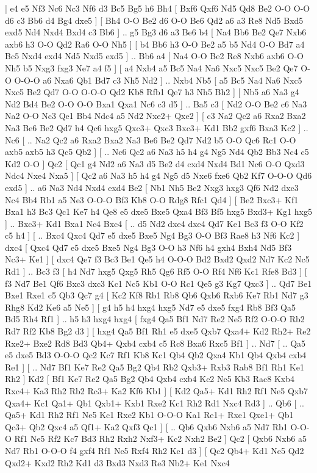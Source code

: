 \makegametitle 
|   e4   e5    Nf3   Nc6    Nc3   Nf6    d3   Bc5    Bg5   h6    Bh4 [  Bxf6 Qxf6  Nd5 Qd8  Be2 O-O  O-O d6  c3 Bb6  d4 Bg4  dxe5   ]  [  Bh4 O-O  Be2 d6  O-O Be6  Qd2 a6  a3 Re8  Nd5 Bxd5  exd5 Nd4  Nxd4 Bxd4  c3 Bb6   ] .. g5    Bg3   d6    a3   Be6    b4 [  Na4 Bb6  Be2 Qe7  Nxb6 axb6  h3 O-O  Qd2 Ra6  O-O Nh5   ]  [  b4 Bb6  h3 O-O  Be2 a5  b5 Nd4  O-O Bd7  a4 Bc5  Nxd4 exd4  Nd5 Nxd5  exd5   ] .. Bb6    a4 [  Na4 O-O  Be2 Re8  Nxb6 axb6  O-O Nh5  b5 Nxg3  fxg3 Ne7  a4 f5   ]  [  a4 Nxb4  a5 Bc5  Na4 Na6  Nxc5 Nxc5  Be2 Qe7  O-O O-O-O  a6 Nxa6  Qb1 Bd7  c3 Nh5  Nd2   ] .. Nxb4    Nb5 [  a5 Bc5  Na4 Na6  Nxc5 Nxc5  Be2 Qd7  O-O O-O-O  Qd2 Kb8  Rfb1 Qe7  h3 Nh5  Bh2   ]  [  Nb5 a6  Na3 g4  Nd2 Bd4  Be2 O-O  O-O Bxa1  Qxa1 Nc6  c3 d5   ] .. Ba5    c3 [  Nd2 O-O  Be2 c6  Na3 Na2  O-O Nc3  Qe1 Bb4  Ndc4 a5  Nd2 Nxe2+  Qxe2   ]  [  c3 Na2  Qc2 a6  Rxa2 Bxa2  Na3 Be6  Be2 Qd7  h4 Qc6  hxg5 Qxc3+  Qxc3 Bxc3+  Kd1 Bb2  gxf6 Bxa3  Kc2   ] .. Nc6 [ .. Na2  Qc2 a6  Rxa2 Bxa2  Na3 Be6  Be2 Qd7  Nd2 b5  O-O Qc6  Rc1 O-O  axb5 axb5  h3 Qc5  Qb2   ]  [ .. Nc6  Qc2 a6  Na3 h5  h4 g4  Ng5 Nd4  Qb2 Bb3  Nc4 c5  Kd2 O-O   ]  Qc2    [  Qc1 g4  Nd2 a6  Na3 d5  Be2 d4  cxd4 Nxd4  Bd1 Nc6  O-O Qxd3  Ndc4 Nxe4  Nxa5   ]  [  Qc2 a6  Na3 h5  h4 g4  Ng5 d5  Nxe6 fxe6  Qb2 Kf7  O-O-O Qd6  exd5   ] .. a6    Na3   Nd4    Nxd4   exd4    Be2 [  Nb1 Nh5  Be2 Nxg3  hxg3 Qf6  Nd2 dxc3  Nc4 Bb4  Rb1 a5  Ne3 O-O-O  Bf3 Kb8  O-O Rdg8  Rfc1 Qd4   ]  [  Be2 Bxc3+  Kf1 Bxa1  h3 Bc3  Qc1 Ke7  h4 Qe8  e5 dxe5  Bxe5 Qxa4  Bf3 Bf5  hxg5 Bxd3+  Kg1 hxg5   ] .. Bxc3+    Kd1   Bxa1    Nc4   Bxc4 [ .. d5  Nd2 dxe4  dxe4 Qd7  Ke1 Bc3  f3 O-O  Kf2 c5  h4   ]  [ .. Bxc4  Qxc4 Qd7  e5 dxe5  Bxe5 Ng4  Bg3 O-O  Bf3 Rae8  h3 Nf6  Kc2   ]  dxc4 [  Qxc4 Qd7  e5 dxe5  Bxe5 Ng4  Bg3 O-O  h3 Nf6  h4 gxh4  Bxh4 Nd5  Bf3 Nc3+  Ke1   ]  [  dxc4 Qe7  f3 Bc3  Be1 Qe5  h4 O-O-O  Bd2 Bxd2  Qxd2 Nd7  Kc2 Nc5  Rd1   ] .. Bc3    f3 [  h4 Nd7  hxg5 Qxg5  Rh5 Qg6  Rf5 O-O  Rf4 Nf6  Kc1 Rfe8  Bd3   ]  [  f3 Nd7  Be1 Qf6  Bxc3 dxc3  Kc1 Nc5  Kb1 O-O  Rc1 Qe5  g3 Kg7  Qxc3   ] .. Qd7    Be1   Bxe1    Rxe1   c5    Qb3   Qc7    g4 [  Kc2 Kf8  Rb1 Rb8  Qb6 Qxb6  Rxb6 Ke7  Rb1 Nd7  g3 Rhg8  Kd2 Ke6  a5 Ne5   ]  [  g4 h5  h4 hxg4  hxg5 Nd7  e5 dxe5  fxg4 Rb8  Bf3 Qa5  Bd5 Rh4  Rf1   ] .. h5    h3   hxg4    hxg4 [  fxg4 Qa5  Bf1 Nd7  Re2 Ne5  Rf2 O-O-O  Rb2 Rd7  Rf2 Kb8  Bg2 d3   ]  [  hxg4 Qa5  Bf1 Rh1  e5 dxe5  Qxb7 Qxa4+  Kd2 Rh2+  Re2 Rxe2+  Bxe2 Rd8  Bd3 Qb4+  Qxb4 cxb4  c5 Rc8  Bxa6 Rxc5  Bf1   ] .. Nd7 [ .. Qa5  e5 dxe5  Bd3 O-O-O  Qc2 Kc7  Rf1 Kb8  Kc1 Qb4  Qb2 Qxa4  Kb1 Qb4  Qxb4 cxb4  Re1   ]  [ .. Nd7  Bf1 Ke7  Re2 Qa5  Bg2 Qb4  Rb2 Qxb3+  Rxb3 Rab8  Bf1 Rh1  Ke1 Rh2   ]  Kd2 [  Bf1 Ke7  Re2 Qa5  Bg2 Qb4  Qxb4 cxb4  Kc2 Ne5  Kb3 Rac8  Kxb4 Rxc4+  Ka3 Rh2  Rb2 Rc3+  Ka2 Kf6  Kb1   ]  [  Kd2 Qa5+  Kd1 Rh2  Rf1 Ne5  Qxb7 Qxa4+  Kc1 Qa1+  Qb1 Qxb1+  Kxb1 Rxe2  Kc1 Rh2  Rd1 Nxc4  Rd3   ] .. Qb6 [ .. Qa5+  Kd1 Rh2  Rf1 Ne5  Kc1 Rxe2  Kb1 O-O-O  Ka1 Re1+  Rxe1 Qxe1+  Qb1 Qc3+  Qb2 Qxc4  a5 Qf1+  Ka2 Qxf3  Qc1   ]  [ .. Qb6  Qxb6 Nxb6  a5 Nd7  Rb1 O-O-O  Rf1 Ne5  Rf2 Kc7  Bd3 Rh2  Rxh2 Nxf3+  Kc2 Nxh2  Be2   ]  Qc2 [  Qxb6 Nxb6  a5 Nd7  Rb1 O-O-O  f4 gxf4  Rf1 Ne5  Rxf4 Rh2  Ke1 d3   ]  [  Qc2 Qb4+  Kd1 Ne5  Qd2 Qxd2+  Kxd2 Rh2  Kd1 d3  Bxd3 Nxd3  Re3 Nb2+  Ke1 Nxc4  